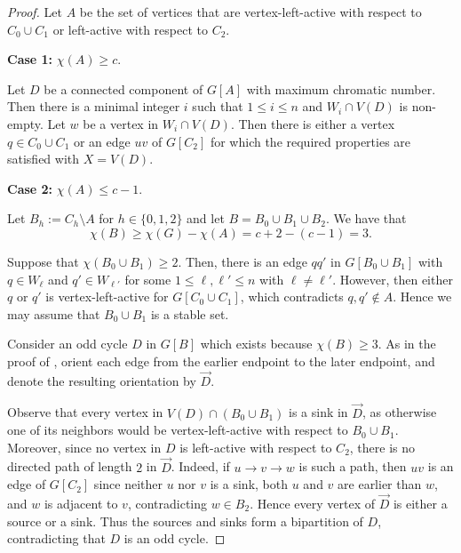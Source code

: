 \documentclass{article}
\begin{document}
\begin{proof}
    Let $A$ be the set of vertices that are vertex-left-active with respect to $C_0 \cup C_1$ or left-active with respect to $C_2$.

    \textbf{Case 1:} $\chi(A) \geq c$.

    Let $D$ be a connected component of $G[A]$ with maximum chromatic number. Then there is a minimal integer $i$ such that $1 \leq i \leq n$ and $W_i \cap V(D)$ is non-empty. Let $w$ be a vertex in $W_i \cap V(D)$. Then there is either a vertex $q \in C_0 \cup C_1$ or an edge $uv$ of $G[C_2]$ for which the required properties are satisfied with $X = V(D)$.

    \textbf{Case 2:} $\chi(A) \leq c - 1$. 

    Let $B_h := C_h \setminus A$ for $h \in \{0, 1, 2\}$ and let $B = B_0 \cup B_1 \cup B_2$. We have that 
    \[\chi(B) \geq \chi(G) - \chi(A) = c+ 2 - (c - 1) = 3.\]

    Suppose that $\chi(B_0 \cup B_1) \geq 2$. Then, there is an edge $qq'$ in $G[B_0 \cup B_1]$ with $q \in W_{\ell}$ and $q' \in W_{\ell'}$ for some $1 \leq \ell, \ell' \leq n$ with $\ell \neq \ell'$. However, then either $q$ or $q'$ is vertex-left-active for $G[C_0 \cup C_1]$, which contradicts $q, q' \not \in A$. Hence we may assume that $B_0 \cup B_1$ is a stable set.
    
    Consider an odd cycle $D$ in $G[B]$ which exists because $\chi(B) \geq 3$. As in the proof of , orient each edge from the earlier endpoint to the later endpoint, and denote the resulting orientation by \(\vec{D}\).

    Observe that every vertex in $V(D) \cap (B_0 \cup B_1)$ is a sink in \(\vec{D}\), as otherwise one of its neighbors would be vertex-left-active with respect to $B_0 \cup B_1$. Moreover, since no vertex in $D$ is left-active with respect to $C_2$, there is no directed path of length $2$ in \(\vec{D}\). Indeed, if \(u \to v \to w\) is such a path, then $uv$ is an edge of $G[C_2]$ since neither $u$ nor $v$ is a sink, both $u$ and $v$ are earlier than $w$, and $w$ is adjacent to $v$, contradicting $w \in B_2$. Hence every vertex of $\vec{D}$ is either a source or a sink. Thus the sources and sinks form a bipartition of $D$, contradicting that $D$ is an odd cycle.
\end{proof}
\end{document}
